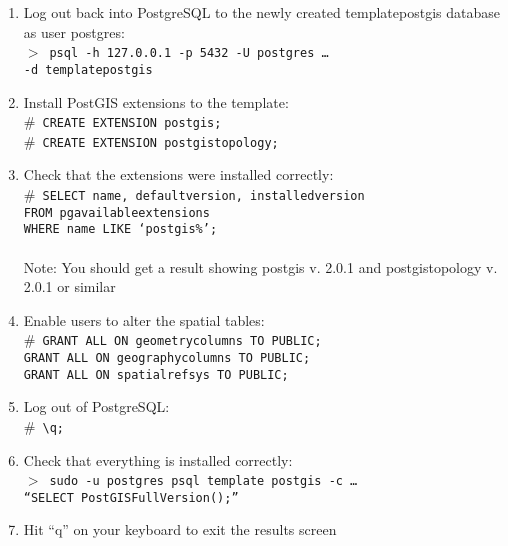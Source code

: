 \begin{enumerate}
\begin{enumerate}
\begin{enumerate}
            \item Log out back into PostgreSQL to the newly created 
                  template\textunderscore postgis database as user postgres:\\ 
                  $>$~\texttt{psql -h 127.0.0.1 -p 5432 -U postgres \hfill \ldots \\
                  -d template\textunderscore postgis}
            \item Install PostGIS extensions to the template:\\ 
                  $\#$~\texttt{CREATE EXTENSION postgis;} \\
                  $\#$~\texttt{CREATE EXTENSION postgis\textunderscore topology;}
            \item Check that the extensions were installed correctly:\\ 
                  $\#$~\texttt{SELECT name, default\textunderscore version,
                  installed\textunderscore version\\ 
                  FROM pg\textunderscore available\textunderscore extensions\\ 
                  WHERE name LIKE `postgis\%';}\\
                  \\
                  Note: You should get a result showing postgis v. 
                  2.0.1 and postgis\textunderscore topology v. 2.0.1 or similar
            \item Enable users to alter the spatial tables:\\
                  $\#$~\texttt{GRANT ALL ON geometry\textunderscore columns TO 
                  PUBLIC;\\
                  GRANT ALL ON geography\textunderscore columns TO PUBLIC;\\
                  GRANT ALL ON spatial\textunderscore ref\textunderscore sys 
                  TO PUBLIC;}
            \item Log out of PostgreSQL:\\
                  $\#$~\texttt{\textbackslash q;}
            \item Check that everything is installed correctly:\\
                  $>$~\texttt{sudo -u postgres psql template\textunderscore 
                  postgis -c \hfill \ldots\\ 
                  ``SELECT 
                  PostGIS\textunderscore Full\textunderscore Version();''}
            \item Hit ``q'' on your keyboard to exit the results screen

\end{enumerate}
\end{enumerate}
\end{enumerate}
